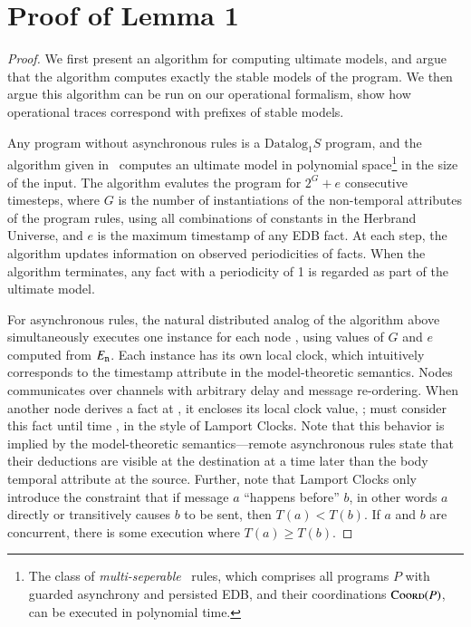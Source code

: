 \section{Proof of Lemma 1}
\begin{proof}
We first present an algorithm for computing ultimate models, and argue that the algorithm computes exactly the stable models of the \lang program.  We then argue this algorithm can be run on our operational formalism, show how operational traces correspond with prefixes of stable models.

Any \lang program without asynchronous rules is a $\text{Datalog}_1S$ program, and the algorithm given in~\cite{tdd} computes an ultimate model in polynomial space\footnote{The class of {\em multi-seperable}~\cite{tdd-poly} \lang rules, which comprises all \lang programs $P$ with guarded asynchrony and persisted EDB, and their coordinations $\textsc{Coord}(P)$, can be executed in polynomial time.} in the size of the input.  The algorithm evalutes the program for $2^G + e$ consecutive timesteps, where $G$ is the number of instantiations of the non-temporal attributes of the program rules, using all combinations of constants in the Herbrand Universe, and $e$ is the maximum timestamp of any EDB fact.  At each step, the algorithm updates information on observed periodicities of facts.  When the algorithm terminates, any fact with a periodicity of 1 is regarded as part of the ultimate model.

For asynchronous rules, the natural distributed analog of the algorithm above simultaneously executes one instance for each node , using values of $G$ and $e$ computed from $E_{\text{\dedalus{{\scriptsize n}}}}$.  Each instance has its own local clock, which intuitively corresponds to the timestamp attribute in the model-theoretic semantics.  Nodes communicates over channels with arbitrary delay and message re-ordering.  When another node  derives a fact at , it encloses its local clock value, ;  must consider this fact until time , in the style of Lamport Clocks.  Note that this behavior is implied by the model-theoretic semantics---remote asynchronous rules state that their deductions are visible at the destination at a time later than the body temporal attribute at the source.  Further, note that Lamport Clocks only introduce the constraint that if message $a$ ``happens before'' $b$, in other words $a$ directly or transitively causes $b$ to be sent, then $T(a) < T(b)$.  If $a$ and $b$ are concurrent, there is some execution where $T(a) \geq T(b)$.


\end{proof}
